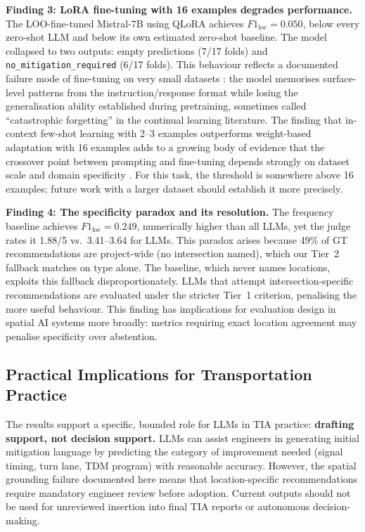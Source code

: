 \documentclass[preprint,12pt]{elsarticle}
\begin{document}
\textbf{Finding 3: LoRA fine-tuning with 16 examples degrades performance.}
The LOO-fine-tuned Mistral-7B \citep{jiang2023mistral} using QLoRA
\citep{dettmers2023qlora} achieves $F1_\text{loc} = 0.050$, below
every zero-shot LLM and below its own estimated zero-shot baseline.
The model collapsed to two outputs: empty predictions (7/17 folds) and
\texttt{no\_mitigation\_required} (6/17 folds).
This behaviour reflects a documented failure mode of fine-tuning on very
small datasets \citep{zhao2021calibrate}: the model memorises surface-level
patterns from the instruction/response format while losing the generalisation
ability established during pretraining, sometimes called ``catastrophic
forgetting'' in the continual learning literature.
The finding that in-context few-shot learning \citep{brown2020gpt3} with
2--3 examples outperforms weight-based adaptation with 16 examples adds
to a growing body of evidence that the crossover point between prompting
and fine-tuning depends strongly on dataset scale and domain specificity
\citep{min2022rethinking}.
For this task, the threshold is somewhere above 16 examples; future work
with a larger dataset should establish it more precisely.

\textbf{Finding 4: The specificity paradox and its resolution.}
The frequency baseline achieves $F1_\text{loc} = 0.249$, numerically
higher than all LLMs, yet the judge rates it 1.88/5 vs.\ 3.41--3.64
for LLMs.
This paradox arises because 49\% of GT recommendations are project-wide
(no intersection named), which our Tier~2 fallback matches on type alone.
The baseline, which never names locations, exploits this fallback
disproportionately.
LLMs that attempt intersection-specific recommendations are evaluated
under the stricter Tier~1 criterion, penalising the more useful behaviour.
This finding has implications for evaluation design in spatial AI
systems more broadly: metrics requiring exact location agreement
may penalise specificity over abstention.

\subsection{Practical Implications for Transportation Practice}

The results support a specific, bounded role for LLMs in TIA practice:
\textbf{drafting support, not decision support.}
LLMs can assist engineers in generating initial mitigation language by predicting the category of improvement needed (signal timing, turn lane,
TDM program) with reasonable accuracy.
However, the spatial grounding failure documented here means that
location-specific recommendations require mandatory engineer review before
adoption.
Current outputs should not be used for unreviewed insertion into final TIA reports or autonomous decision-making.
\end{document}
